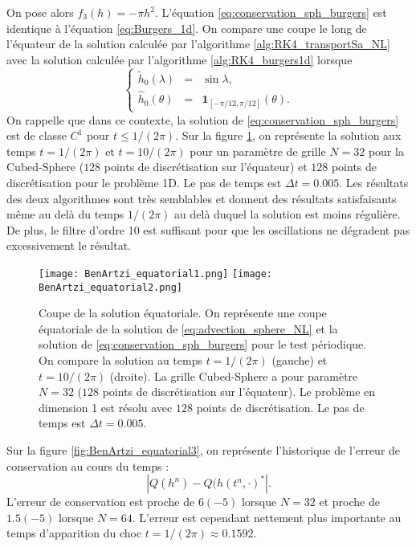 On pose alors $f_3(h) = - \pi h^2$. L'équation \eqref{eq:conservation_sph_burgers} est identique à l'équation \eqref{eq:Burgers_1d}. On compare une coupe le long de l'équateur de la solution calculée par l'algorithme \ref{alg:RK4_transportSa_NL} avec la solution calculée par l'algorithme \ref{alg:RK4_burgers1d} lorsque
\begin{equation}
\left\lbrace
\begin{array}{rcl}
\tilde{h}_0(\lambda) & = & \sin \lambda, \\
\hat{h}_0(\theta) & = & \mathbf{1}_{[-\pi/12, \pi/12]}(\theta).
\end{array}
\right.
\end{equation}
On rappelle que dans ce contexte, la solution de \eqref{eq:conservation_sph_burgers} est de classe $C^1$ pour $t \leq 1/(2 \pi)$. Sur la figure \ref{fig:BenArtzi_equatorial1}, on représente la solution aux temps $t=1/(2 \pi)$ et $t=10/(2\pi)$ pour un paramètre de grille $N=32$ pour la Cubed-Sphere ($128$ points de discrétisation sur l'équateur) et $128$ points de discrétisation pour le problème 1D. Le pas de temps est $\Delta t=0.005$. Les résultats des deux algorithmes sont très semblables et donnent des résultats satisfaisants même au delà du temps $1/(2 \pi)$ au delà duquel la solution est moins régulière. De plus, le filtre d'ordre 10 est suffisant pour que les oscillations ne dégradent pas excessivement le résultat.

\begin{figure}[htbp]
\begin{center}
\texttt{[image: BenArtzi\_equatorial1.png]}
\texttt{[image: BenArtzi\_equatorial2.png]}
\end{center}
\caption{Coupe de la solution équatoriale. On représente une coupe équatoriale de la solution de \eqref{eq:advection_sphere_NL} et la solution de \eqref{eq:conservation_sph_burgers} pour le test périodique. On compare la solution au temps $t=1/(2\pi)$ (gauche) et $t=10/(2\pi)$ (droite). La grille Cubed-Sphere a pour paramètre $N=32$ ($128$ points de discrétisation sur l'équateur). Le problème en dimension 1 est résolu avec $128$ points de discrétisation. Le pas de temps est $\Delta t = 0.005$.}
\label{fig:BenArtzi_equatorial1}
\end{figure} 

Sur la figure \ref{fig:BenArtzi_equatorial3}, on représente l'historique de l'erreur de conservation au cours du temps :
\begin{equation}
|Q(h^n) - Q(h(t^n, \cdot)^*|.
\end{equation}
L'erreur de conservation est proche de $6 (-5)$ lorsque $N=32$ et proche de $1.5 (-5)$ lorsque $N=64$. L'erreur est cependant nettement plus importante au temps d'apparition du choc $t=1/(2\pi) \approx 0.1592$. 

